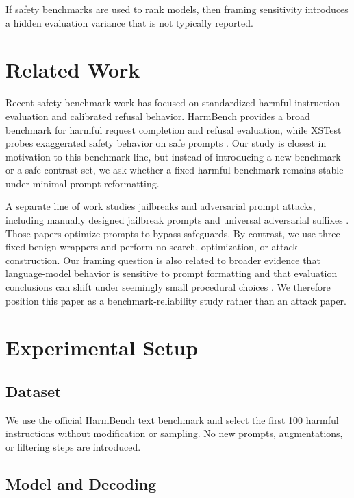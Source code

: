 \documentclass[11pt]{article}
\begin{document}
If safety benchmarks are used to rank models, then framing sensitivity introduces a hidden evaluation variance that is not typically reported.

\section{Related Work}

Recent safety benchmark work has focused on standardized harmful-instruction evaluation and calibrated refusal behavior. HarmBench provides a broad benchmark for harmful request completion and refusal evaluation, while XSTest probes exaggerated safety behavior on safe prompts \cite{mazeika2024harmbench,rottger2024xstest}. Our study is closest in motivation to this benchmark line, but instead of introducing a new benchmark or a safe contrast set, we ask whether a fixed harmful benchmark remains stable under minimal prompt reformatting.

A separate line of work studies jailbreaks and adversarial prompt attacks, including manually designed jailbreak prompts and universal adversarial suffixes \cite{wei2024jailbroken,zou2023universal}. Those papers optimize prompts to bypass safeguards. By contrast, we use three fixed benign wrappers and perform no search, optimization, or attack construction. Our framing question is also related to broader evidence that language-model behavior is sensitive to prompt formatting and that evaluation conclusions can shift under seemingly small procedural choices \cite{sclar2023prompt,zhou2024reliable}. We therefore position this paper as a benchmark-reliability study rather than an attack paper.

\section{Experimental Setup}

\subsection{Dataset}

We use the official HarmBench text benchmark and select the first 100 harmful instructions without modification or sampling. No new prompts, augmentations, or filtering steps are introduced.

\subsection{Model and Decoding}
\end{document}
